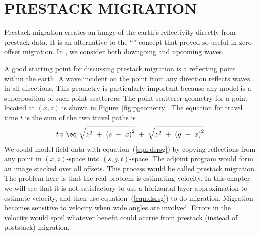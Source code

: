 \section{PRESTACK MIGRATION}
Prestack migration creates an image of the earth's reflectivity
directly from prestack data.
It is an alternative to
the ``'' concept
that proved so useful in zero-offset migration.
In ,
we consider both downgoing and upcoming waves.
\par
A good starting point for discussing prestack migration is a reflecting 
point within the earth.
A wave incident on the point from any direction
reflects waves in all directions.
This geometry is particularly important because
any model is a superposition of such point scatterers.
The point-scatterer geometry for a point
located at $(x,z)$ is shown in Figure~\ref{fig:pgeometry}. %
The equation
for travel time  $t$  is the sum of the two travel paths is
\begin{equation}
t\,v\  \eq \  \sqrt { z^2\ +\ {( s \ -\  x ) }^2}  
\ +\  \sqrt { z^2 \ +\ {( g \ -\  x )}^2} 
\label{eqn:dsrsg}
\end{equation}
We could model field data
with equation~(\ref{eqn:dsrsg}) by copying reflections from any point
in $(x,z)$-space into $(s,g,t)$-space.
The adjoint program would form an image stacked over
all offsets.
This process would be called prestack migration.
The problem here is that the real problem
is estimating velocity.
In this chapter we will see that it is not satisfactory
to use a horizontal layer approximation to estimate velocity,
and then use equation~(\ref{eqn:dsrsg}) to do migration.
Migration becomes sensitive to velocity when wide angles are involved.
Errors in the velocity would spoil whatever benefit could
accrue from prestack (instead of poststack) migration.

